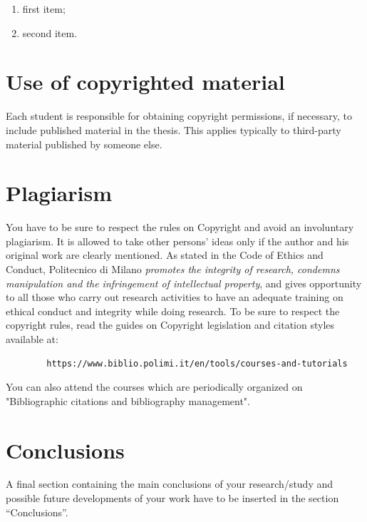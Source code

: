 \documentclass[11pt,a4paper]{article}
\begin{document}
    \begin{enumerate}
        \item first item;
        \item second item.
    \end{enumerate}

\section{Use of copyrighted material}

    Each student is responsible for obtaining copyright permissions, if necessary, to include published material in the thesis. This applies typically to third-party material published by someone else.

\section{Plagiarism}

    You have to be sure to respect the rules on Copyright and avoid an involuntary plagiarism. It is allowed to take other persons' ideas only if the author and his original work are clearly mentioned. As stated in the Code of Ethics and Conduct, Politecnico di Milano \textit{promotes the integrity of research, condemns manipulation and the infringement of intellectual property}, and gives opportunity to all those who carry out research activities to have an adequate training on ethical conduct and integrity while doing research. To be sure to respect the copyright rules, read the guides on Copyright legislation and citation styles available at:

    \begin{verbatim}
        https://www.biblio.polimi.it/en/tools/courses-and-tutorials
    \end{verbatim}

    You can also attend the courses which are periodically organized on "Bibliographic citations and bibliography management".

\section{Conclusions}

    \color{black}
    A final section containing the main conclusions of your research/study
    and possible future developments of your work have to be inserted in the section ``Conclusions''.
\end{document}
